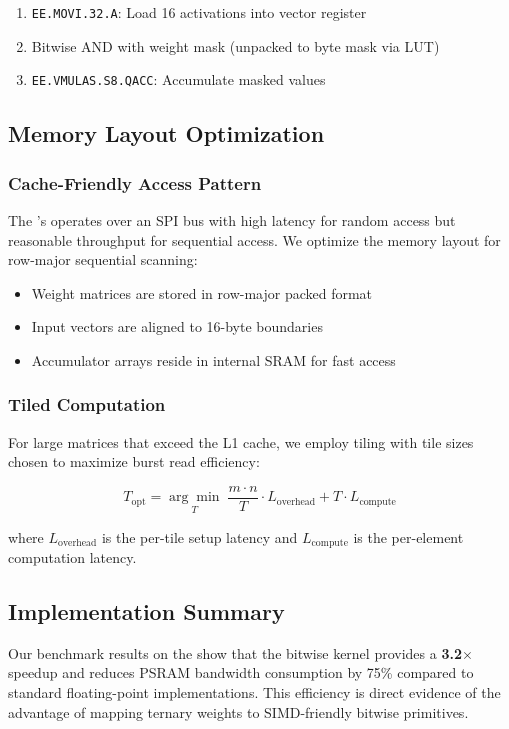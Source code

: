 \begin{enumerate}[leftmargin=*,topsep=2pt,itemsep=1pt]
  \item \texttt{EE.MOVI.32.A}: Load 16 activations into vector register
  \item Bitwise AND with weight mask (unpacked to byte mask via LUT)
  \item \texttt{EE.VMULAS.S8.QACC}: Accumulate masked values
\end{enumerate}

\subsection{Memory Layout Optimization}

\subsubsection{Cache-Friendly Access Pattern}

The \espss{}'s \psram{} operates over an SPI bus with high latency for
random access but reasonable throughput for sequential access. We optimize
the memory layout for row-major sequential scanning:

\begin{itemize}[leftmargin=*,topsep=2pt,itemsep=1pt]
  \item Weight matrices are stored in row-major packed format
  \item Input vectors are aligned to 16-byte boundaries
  \item Accumulator arrays reside in internal SRAM for fast access
\end{itemize}

\subsubsection{Tiled Computation}

For large matrices that exceed the L1 cache, we employ tiling with
tile sizes chosen to maximize \psram{} burst read efficiency:

\begin{equation}
T_{\text{opt}} = \underset{T}{\arg\min} \; \frac{m \cdot n}{T} \cdot L_{\text{overhead}}
+ T \cdot L_{\text{compute}}
\end{equation}

\noindent where $L_{\text{overhead}}$ is the per-tile setup latency and
$L_{\text{compute}}$ is the per-element computation latency.

\subsection{Implementation Summary}

    Our benchmark results on the \espss{} show that the bitwise \gemv{} kernel
    provides a \textbf{3.2$\times$} speedup and reduces PSRAM bandwidth consumption
    by 75\% compared to standard floating-point implementations. This efficiency
    is direct evidence of the advantage of mapping ternary weights to 
    SIMD-friendly bitwise primitives.
